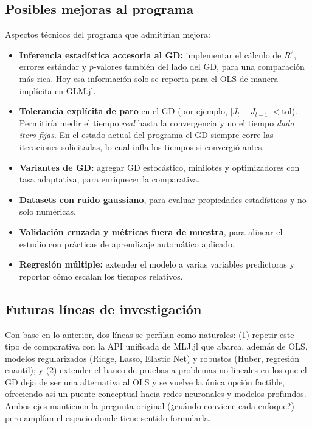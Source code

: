 \documentclass[11pt,a4paper]{article}
\begin{document}
\subsection{Posibles mejoras al programa}

Aspectos técnicos del programa que admitirían mejora:

\begin{itemize}
    \item \textbf{Inferencia estadística accesoria al GD:} implementar el cálculo de $R^2$, errores estándar y $p$-valores también del lado del GD, para una comparación más rica. Hoy esa información solo se reporta para el OLS de manera implícita en GLM.jl.
    \item \textbf{Tolerancia explícita de paro} en el GD (por ejemplo, $|J_t - J_{t-1}| < \mathrm{tol}$). Permitiría medir el tiempo \textit{real} hasta la convergencia y no el tiempo \textit{dado iters fijas}. En el estado actual del programa el GD siempre corre las iteraciones solicitadas, lo cual infla los tiempos si convergió antes.
    \item \textbf{Variantes de GD:} agregar GD estocástico, minilotes y optimizadores con tasa adaptativa, para enriquecer la comparativa.
    \item \textbf{Datasets con ruido gaussiano}, para evaluar propiedades estadísticas y no solo numéricas.
    \item \textbf{Validación cruzada y métricas fuera de muestra}, para alinear el estudio con prácticas de aprendizaje automático aplicado.
    \item \textbf{Regresión múltiple:} extender el modelo a varias variables predictoras y reportar cómo escalan los tiempos relativos.
\end{itemize}

\subsection{Futuras líneas de investigación}

Con base en lo anterior, dos líneas se perfilan como naturales: (1) repetir este tipo de comparativa con la API unificada de MLJ.jl que abarca, además de OLS, modelos regularizados (Ridge, Lasso, Elastic Net) y robustos (Huber, regresión cuantil); y (2) extender el banco de pruebas a problemas no lineales en los que el GD deja de ser una alternativa al OLS y se vuelve la única opción factible, ofreciendo así un puente conceptual hacia redes neuronales y modelos profundos. Ambos ejes mantienen la pregunta original (¿cuándo conviene cada enfoque?) pero amplían el espacio donde tiene sentido formularla.
\end{document}
